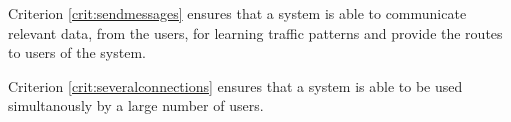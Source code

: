 Criterion \ref{crit:sendmessages} ensures that a system is able to communicate relevant data, from the users, for learning traffic patterns and provide the routes to users of the system.

Criterion \ref{crit:severalconnections} ensures that a system is able to be used simultanously by a large number of users.



